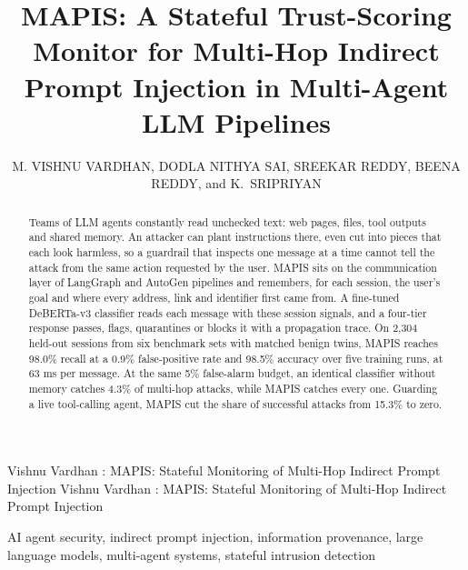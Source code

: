 \documentclass{ieeeaccess}
\begin{document}
\newlength{\xfigwd}
\setlength{\xfigwd}{\columnwidth}
\def\theyear{2026}

\title{MAPIS: A Stateful Trust-Scoring Monitor for Multi-Hop Indirect Prompt Injection in Multi-Agent LLM Pipelines}

\author{\uppercase{M. Vishnu Vardhan},
\uppercase{Dodla Nithya Sai},
\uppercase{Sreekar Reddy},
\uppercase{Beena Reddy}, and
\mbox{\uppercase{K. Sripriyan}}}
\address[1]{Amrita School of Artificial Intelligence, Coimbatore 641112, Amrita Vishwa Vidyapeetham, India}

\markboth
{Vishnu Vardhan \headeretal: MAPIS: Stateful Monitoring of Multi-Hop Indirect Prompt Injection}
{Vishnu Vardhan \headeretal: MAPIS: Stateful Monitoring of Multi-Hop Indirect Prompt Injection}


\begin{abstract}
Teams of LLM agents constantly read unchecked text: web pages, files, tool outputs and shared memory. An attacker can plant instructions there, even cut into pieces that each look harmless, so a guardrail that inspects one message at a time cannot tell the attack from the same action requested by the user. MAPIS sits on the communication layer of LangGraph and AutoGen pipelines and remembers, for each session, the user's goal and where every address, link and identifier first came from. A fine-tuned DeBERTa-v3 classifier reads each message with these session signals, and a four-tier response passes, flags, quarantines or blocks it with a propagation trace. On 2,304 held-out sessions from six benchmark sets with matched benign twins, MAPIS reaches 98.0\% recall at a 0.9\% false-positive rate and 98.5\% accuracy over five training runs, at 63 ms per message. At the same 5\% false-alarm budget, an identical classifier without memory catches 4.3\% of multi-hop attacks, while MAPIS catches every one. Guarding a live tool-calling agent, MAPIS cut the share of successful attacks from 15.3\% to zero.
\end{abstract}

\begin{keywords}
AI agent security, indirect prompt injection, information provenance, large language models, multi-agent systems, stateful intrusion detection
\end{keywords}
\end{document}
